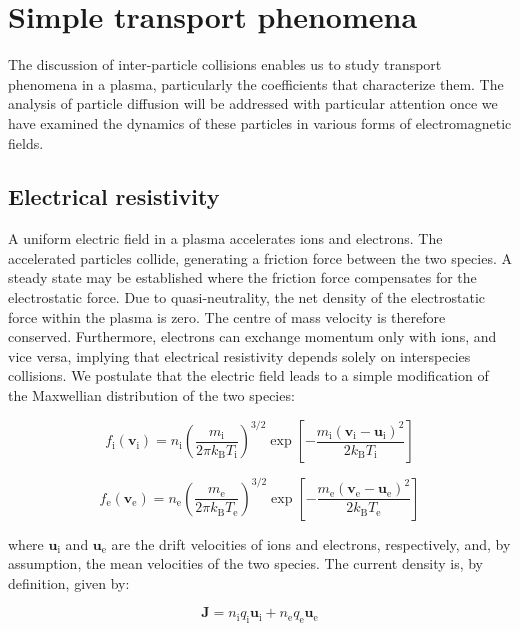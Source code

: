 \section{Simple transport phenomena}

The discussion of inter-particle collisions enables us to study transport phenomena in a plasma, particularly the coefficients that characterize them. The analysis of particle diffusion will be addressed with particular attention once we have examined the dynamics of these particles in various forms of electromagnetic fields.

\subsection{Electrical resistivity}

A uniform electric field in a plasma accelerates ions and electrons. The accelerated particles collide, generating a friction force between the two species. A steady state may be established where the friction force compensates for the electrostatic force. Due to quasi-neutrality, the net density of the electrostatic force within the plasma is zero. The centre of mass velocity is therefore conserved. Furthermore, electrons can exchange momentum only with ions, and vice versa, implying that electrical resistivity depends solely on interspecies collisions. We postulate that the electric field leads to a simple modification of the Maxwellian distribution of the two species:

\begin{equation}
    f_\mathrm{i}(\mathbf{v}_\mathrm{i})=n_\mathrm{i}\left(\frac{m_\mathrm{i}}{2\pi k_\mathrm{B}T_\mathrm{i}}\right)^{3/2}\exp{\left[-\frac{m_\mathrm{i}(\mathbf{v}_\mathrm{i}-\mathbf{u}_\mathrm{i})^2}{2k_\mathrm{B}T_\mathrm{i}}\right]}
\end{equation}

\begin{equation}
    f_\text{e}(\mathbf{v}_\text{e})=n_\text{e}\left(\frac{m_\text{e}}{2\pi k_\mathrm{B}T_\text{e}}\right)^{3/2}\exp{\left[-\frac{m_\text{e}(\mathbf{v}_\text{e}-\mathbf{u}_\text{e})^2}{2k_\mathrm{B}T_\text{e}}\right]}
\end{equation}

where $\mathbf{u}_\mathrm{i}$ and $\mathbf{u}_\text{e}$ are the drift velocities of ions and electrons, respectively, and, by assumption, the mean velocities of the two species. The current density is, by definition, given by:

\begin{equation}
    \mathbf{J}=n_\mathrm{i}q_\mathrm{i}\mathbf{u}_\mathrm{i}+n_\text{e}q_\text{e}\mathbf{u}_\text{e}
\end{equation}

